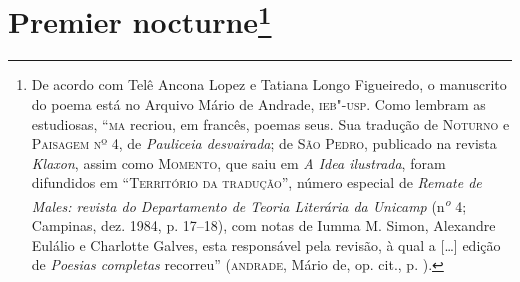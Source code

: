 \section{Premier nocturne\footnote[*]{De acordo com Telê Ancona Lopez e
  Tatiana Longo Figueiredo, o manuscrito do poema está no Arquivo Mário
  de Andrade, \textsc{ieb"-usp}. Como lembram as estudiosas, ``\textsc{ma} recriou, em
  francês, poemas seus. Sua tradução de \textsc{Noturno} e
  \textsc{Paisagem nº 4,} de \emph{Pauliceia desvairada}; de \textsc{São
  Pedro,} publicado na revista \emph{Klaxon}, assim como
  \textsc{Momento}, que saiu em \emph{A Idea ilustrada}, foram
  difundidos em ``\textsc{Território da tradução}'', número especial de
  \emph{Remate de Males: revista do Departamento de Teoria Literária da
  Unicamp} (n\textsuperscript{\emph{o}} 4; Campinas, dez. 1984, p.
  17--18), com notas de Iumma M. Simon, Alexandre Eulálio e Charlotte
  Galves, esta responsável pela revisão, à qual a {[}\ldots{}{]} edição de
  \emph{Poesias completas} recorreu'' (\textsc{andrade}, Mário de, op. cit., p.
  ).}}

